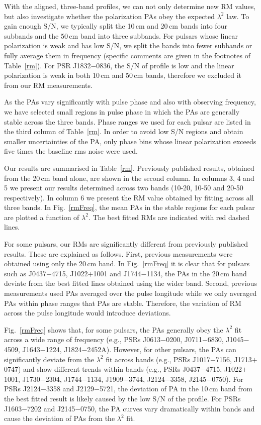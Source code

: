 \documentclass[useAMS,usenatbib]{mn2e}
\begin{document}
With the aligned, three-band profiles, we can not only determine new  
RM values, but also investigate whether the polarization PAs obey the 
expected $\lambda^2$ law.
%
To gain enough S/N, we typically split the 10\,cm and 20\,cm bands into four subbands 
and the 50\,cm band into three subbands. For pulsars whose linear polarization is weak 
and has low S/N, we split the bands into fewer subbands or fully average them in frequency 
(specific comments are given in the footnotes of Table~\ref{rm}). For PSR J1832$-$0836, 
the S/N of profile is low and the linear polarization is weak in both 10\,cm and 50\,cm bands, 
therefore we excluded it from our RM measurements.
%

As the PAs vary significantly with pulse phase and also with observing frequency, 
we have selected small regions in pulse phase in which the PAs are generally stable across 
the three bands. 
%
Phase ranges we used for each pulsar are listed in the third column of Table~\ref{rm}.
%
In order to avoid low S/N regions and obtain smaller uncertainties of the PA, only 
phase bins whose linear polarization exceeds five times the baseline rms noise 
were used.

Our results are summarised in Table~\ref{rm}. Previously published results, obtained 
from the 20\,cm band alone, are shown in the second column. In columns 3, 4 and 5 we 
present our results determined across two bands (10-20, 10-50 and 20-50 respectively).  
In column 6 we present the RM value obtained by fitting across all three bands.  
In Fig.~\ref{rmFreq}, the mean PAs in the stable regions for each pulsar are plotted 
a function of $\lambda^2$. The best fitted RMs are indicated with red dashed lines. 

For some pulsars, our RMs are significantly different from previously published results. 
These are explained as follows.
%
First, previous measurements were obtained using only the 20\,cm band. 
In Fig.~\ref{rmFreq} it is clear that for pulsars such as J0437$-$4715,
J1022$+$1001 and J1744$-$1134, the PAs in the 20\,cm band deviate from the 
best fitted lines obtained using the wider band.
%
Second, previous measurements used PAs averaged over the pulse longitude 
while we only averaged PAs within phase ranges that PAs are stable. Therefore, 
the variation of RM across the pulse longitude would introduce deviations.
%

Fig.~\ref{rmFreq} shows that, for some pulsars, the PAs generally obey the 
$\lambda^2$ fit across a wide range of frequency (e.g., PSRs J0613$-$0200, 
J0711$-$6830, J1045$-$4509, J1643$-$1224, J1824$-$2452A). 
%
However, for other pulsars, the PAs can significantly deviate from the $\lambda^2$ fit
across bands (e.g., PSRs J1017$-$7156, J1713$+$0747) and show different trends within bands 
(e.g., PSRs J0437$-$4715, J1022$+$1001, J1730$-$2304, J1744$-$1134, J1909$-$3744, J2124$-$3358, 
J2145$-$0750).  
%
For PSRs J2124$-$3358 and J2129$-$5721, the deviation of PA in the 10\,cm band 
from the best fitted result is likely caused by the low S/N of the profile.
%
For PSRs J1603$-$7202 and J2145$-$0750, the PA curves vary dramatically within 
bands and cause the deviation of PAs from the $\lambda^2$ fit.
\end{document}
